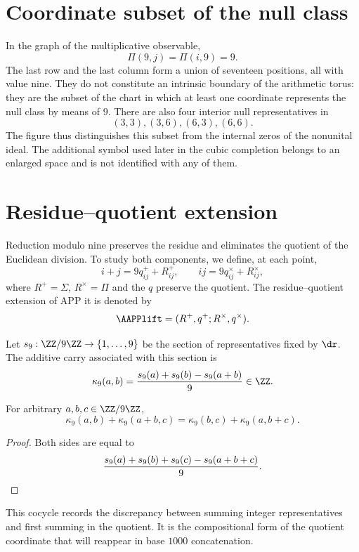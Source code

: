 \section{Coordinate subset of the null class}

In the graph of the multiplicative observable,
\[
\Pi(9,j)=\Pi(i,9)=9.
\]
The last row and the last column form a union of seventeen positions,
all with value nine. They do not constitute an intrinsic boundary of the arithmetic
torus: they are the subset of the chart in which at least one coordinate
represents the null class by means of \(9\). There are also four interior null representatives in
\[
(3,3),(3,6),(6,3),(6,6).
\]
The figure thus distinguishes this subset from the internal zeros of the
nonunital ideal. The additional symbol used later in the cubic
completion belongs to an enlarged space and is not identified with any of
them.

\section{Residue--quotient extension}

Reduction modulo nine preserves the residue and eliminates the quotient of the
Euclidean division. To study both components, we define, at each point,
\[
i+j=9q^+_{ij}+R^+_{ij},
\qquad
ij=9q^\times_{ij}+R^\times_{ij},
\]
where \(R^+=\Sigma\), \(R^\times=\Pi\) and the \(q\) preserve the quotient.
The residue--quotient extension of APP it is denoted by
\[
\AAPPlift=(R^+,q^+;R^\times,q^\times).
\]

Let \(s_9:\ZZ/9\ZZ\to\{1,\ldots,9\}\) be the section of representatives fixed
by \(\dr\). The additive carry associated with this section is
\[
 \kappa_9(a,b)
 =\frac{s_9(a)+s_9(b)-s_9(a+b)}9\in\ZZ.
\]

\begin{lemma}
\label{lem:app-cociclo-acarreo}
For arbitrary \(a,b,c\in\ZZ/9\ZZ\),
\[
 \kappa_9(a,b)+\kappa_9(a+b,c)
 =\kappa_9(b,c)+\kappa_9(a,b+c).
\]
\end{lemma}

\begin{proof}
Both sides are equal to
\[
 \frac{s_9(a)+s_9(b)+s_9(c)-s_9(a+b+c)}9.\qedhere
\]
\end{proof}

This cocycle records the discrepancy between summing integer representatives and
first summing in the quotient. It is the compositional form of the
quotient coordinate that will reappear in base \(1000\) concatenation.

